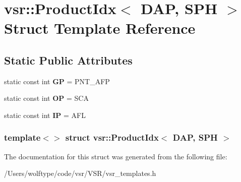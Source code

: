 \hypertarget{structvsr_1_1_product_idx_3_01_d_a_p_00_01_s_p_h_01_4}{\section{vsr\-:\-:Product\-Idx$<$ D\-A\-P, S\-P\-H $>$ Struct Template Reference}
\label{structvsr_1_1_product_idx_3_01_d_a_p_00_01_s_p_h_01_4}
}
\subsection*{Static Public Attributes}
\begin{DoxyCompactItemize}
\item 
\hypertarget{structvsr_1_1_product_idx_3_01_d_a_p_00_01_s_p_h_01_4_a13c801f4d45a75d3882bfaa1265c9ec5}{static const int {\bfseries G\-P} = P\-N\-T\-\_\-\-A\-F\-P}\label{structvsr_1_1_product_idx_3_01_d_a_p_00_01_s_p_h_01_4_a13c801f4d45a75d3882bfaa1265c9ec5}

\item 
\hypertarget{structvsr_1_1_product_idx_3_01_d_a_p_00_01_s_p_h_01_4_a11bdadf97b45934b6cfc56807ab2f1b3}{static const int {\bfseries O\-P} = S\-C\-A}\label{structvsr_1_1_product_idx_3_01_d_a_p_00_01_s_p_h_01_4_a11bdadf97b45934b6cfc56807ab2f1b3}

\item 
\hypertarget{structvsr_1_1_product_idx_3_01_d_a_p_00_01_s_p_h_01_4_a177223391513264e6d2e498c45fd7e03}{static const int {\bfseries I\-P} = A\-F\-L}\label{structvsr_1_1_product_idx_3_01_d_a_p_00_01_s_p_h_01_4_a177223391513264e6d2e498c45fd7e03}

\end{DoxyCompactItemize}
\subsubsection*{template$<$$>$ struct vsr\-::\-Product\-Idx$<$ D\-A\-P, S\-P\-H $>$}



The documentation for this struct was generated from the following file\-:\begin{DoxyCompactItemize}
\item 
/\-Users/wolftype/code/vsr/\-V\-S\-R/vsr\-\_\-templates.\-h\end{DoxyCompactItemize}
